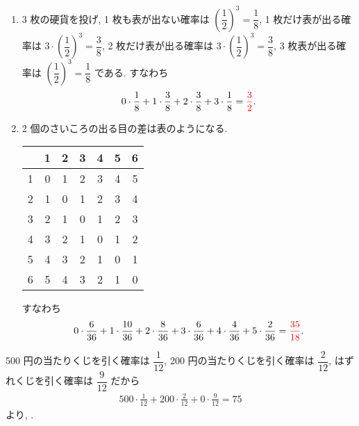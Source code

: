 \begin{enumerate}
	\item{
		3 枚の硬貨を投げ, 1 枚も表が出ない確率は $\left(\dfrac{1}{2}\right)^{3} = \dfrac{1}{8}$, 1 枚だけ表が出る確率は $3\cdot\left(\dfrac{1}{2}\right)^{3} = \dfrac{3}{8}$, 2 枚だけ表が出る確率は $3\cdot\left(\dfrac{1}{2}\right)^{3} = \dfrac{3}{8}$, 3 枚表が出る確率は $\left(\dfrac{1}{2}\right)^{3} = \dfrac{1}{8}$ である.
		すなわち
		\begin{align}
			0\cdot\frac{1}{8} + 1\cdot\frac{3}{8} + 2\cdot\frac{3}{8} + 3\cdot\frac{1}{8} = \textcolor{red}{\frac{3}{2}}.
		\end{align}
	}
	\item{
		2 個のさいころの出る目の差は表のようになる.
		\begin{table}[H]
			\centering
			\begin{tabular}{c|cccccc}
				  & 1 & 2 & 3 & 4 & 5 & 6 \\ \hline
				1 & 0 & 1 & 2 & 3 & 4 & 5 \\
				2 & 1 & 0 & 1 & 2 & 3 & 4 \\
				3 & 2 & 1 & 0 & 1 & 2 & 3 \\
				4 & 3 & 2 & 1 & 0 & 1 & 2 \\
				5 & 4 & 3 & 2 & 1 & 0 & 1 \\
				6 & 5 & 4 & 3 & 2 & 1 & 0 \\
			\end{tabular}
		\end{table}
		すなわち
		\begin{align}
			0\cdot\frac{6}{36} + 1\cdot\frac{10}{36} + 2\cdot\frac{8}{36} + 3\cdot\frac{6}{36} + 4\cdot\frac{4}{36} + 5\cdot\frac{2}{36} = \textcolor{red}{\frac{35}{18}}.
		\end{align}
	}
\end{enumerate}

500 円の当たりくじを引く確率は $\dfrac{1}{12}$, 200 円の当たりくじを引く確率は $\dfrac{2}{12}$, はずれくじを引く確率は $\dfrac{9}{12}$ だから
\begin{align}
	500\cdot\frac{1}{12} + 200\cdot\frac{2}{12} + 0\cdot\frac{9}{12} = 75
\end{align}
より, .

